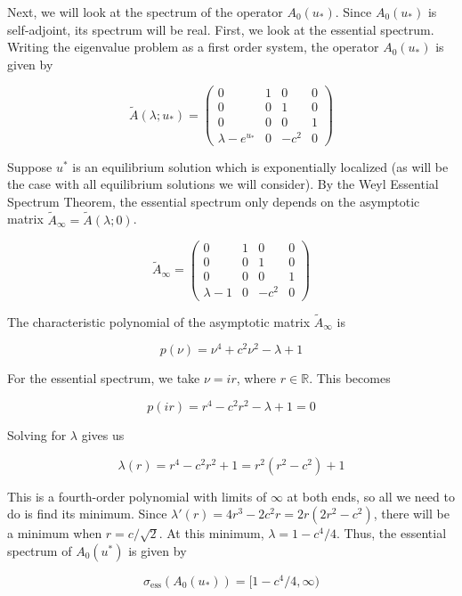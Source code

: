 \documentclass[12pt]{article}
\def\R{{\mathbb R}}
\begin{document}
Next, we will look at the spectrum of the operator $A_0(u_*)$. Since $A_0(u_*)$ is self-adjoint, its spectrum will be real. First, we look at the essential spectrum. Writing the eigenvalue problem as a first order system, the operator $A_0(u_*)$ is given by

\begin{equation}\label{A0system}
\tilde{A}(\lambda; u_*) = \begin{pmatrix}
0 & 1 & 0 & 0 \\
0 & 0 & 1 & 0 \\
0 & 0 & 0 & 1 \\
\lambda - e^{u_*} & 0 & -c^2 & 0 
\end{pmatrix}
\end{equation}

Suppose $u^*$ is an equilibrium solution which is exponentially localized (as will be the case with all equilibrium solutions we will consider). By the Weyl Essential Spectrum Theorem, the essential spectrum only depends on the asymptotic matrix $\tilde{A}_\infty = \tilde{A}(\lambda; 0)$.

\begin{equation}
\tilde{A}_\infty = \begin{pmatrix}
0 & 1 & 0 & 0 \\
0 & 0 & 1 & 0 \\
0 & 0 & 0 & 1 \\
\lambda - 1 & 0 & -c^2 & 0 
\end{pmatrix}
\end{equation}

The characteristic polynomial of the asymptotic matrix $\tilde{A}_\infty$ is 

\[
p(\nu) = \nu^4 + c^2 \nu^2 - \lambda + 1
\]

For the essential spectrum, we take $\nu = i r$, where $r \in \R$. This becomes

\[
p(i r) = r^4 - c^2 r^2 - \lambda + 1 = 0
\]

Solving for $\lambda$ gives us

\[
\lambda(r) = r^4 - c^2 r^2 + 1 = r^2(r^2 - c^2) + 1
\]

This is a fourth-order polynomial with limits of $\infty$ at both ends, so all we need to do is find its minimum. Since $\lambda'(r) = 4 r^3 - 2 c^2 r = 2 r(2 r^2 - c^2)$, there will be a minimum when $r = c/\sqrt{2}$. At this minimum, $\lambda = 1 - c^4/4$. Thus, the essential spectrum of $A_0(u^*)$ is given by

\begin{equation}\label{A0ess}
\sigma_{\text{ess}}(A_0(u_*)) = [1 - c^4/4, \infty)
\end{equation}
\end{document}
